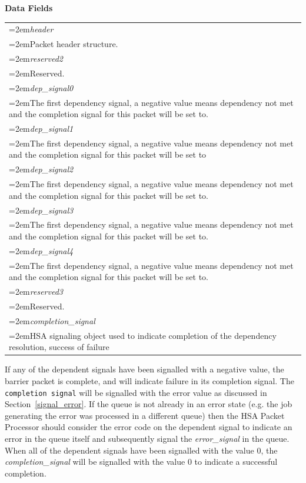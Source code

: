 \documentclass{book}
\newcommand{\hsaarg}[1]{\textit{#1}}
\newcommand{\reffld}[1]{\textit{#1}}
\begin{document}
\noindent\textbf{Data Fields}\\[-5mm]
\begin{longtable}{@{}>{\hangindent=2em}p{\textwidth}}
\hsaarg{header}\\\hspace{2em}Packet header structure.\\[2mm]
\hsaarg{reserved2}\\\hspace{2em}Reserved.\\[2mm]
\hsaarg{dep\_signal0}\\\hspace{2em}The first dependency signal, a negative value means dependency not met and the completion signal for this packet will be set to.\\[2mm]
\hsaarg{dep\_signal1}\\\hspace{2em}The first dependency signal, a negative value means dependency not met and the completion signal for this packet will be set to\\[2mm]
\hsaarg{dep\_signal2}\\\hspace{2em}The first dependency signal, a negative value means dependency not met and the completion signal for this packet will be set to.\\[2mm]
\hsaarg{dep\_signal3}\\\hspace{2em}The first dependency signal, a negative value means dependency not met and the completion signal for this packet will be set to.\\[2mm]
\hsaarg{dep\_signal4}\\\hspace{2em}The first dependency signal, a negative value means dependency not met and the completion signal for this packet will be set to.\\[2mm]
\hsaarg{reserved3}\\\hspace{2em}Reserved.\\[2mm]
\hsaarg{completion\_signal}\\\hspace{2em}HSA signaling object used to indicate completion of the dependency resolution, success of failure
\end{longtable}

 

If any of the dependent signals have been signalled with a negative
value, the barrier packet is complete, and will indicate failure in
its completion signal. The \texttt{completion signal} will be
signalled with the error value as discussed in
Section~\ref{signal_error}. If the queue is not already in an error
state (e.g. the job generating the error was processed in a different
queue) then the HSA Packet Processor should consider the error code on
the dependent signal to indicate an error in the queue itself and
subsequently signal the \reffld{error\_signal} in the queue. When all
of the dependent signals have been signalled with the value 0, the
\reffld{completion\_signal} will be signalled with the value 0 to
indicate a successful completion.
\end{document}
